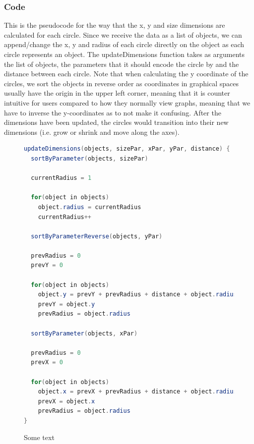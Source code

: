 \documentclass[Report.tex]{subfiles}
\begin{document}
\subsubsection{Code}
This is the pseudocode for the way that the x, y and size dimensions are calculated for each circle.
Since we receive the data as a list of objects, we can append/change the x, y and radius of each circle directly on the object as each circle represents an object. The updateDimensions function takes as arguments the list of objects, the parameters that it should encode the circle by and the distance between each circle. Note that when calculating the y coordinate of the circles, we sort the objects in reverse order as coordinates in graphical spaces usually have the origin in the upper left corner, meaning that it is counter intuitive for users compared to how they normally view graphs, meaning that we have to inverse the y-coordinates as to not make it confusing. After the dimensions have been updated, the circles would transition into their new dimensions (i.e. grow or shrink and move along the axes).
\begin{figure}
\begin{lstlisting}[language=java]
updateDimensions(objects, sizePar, xPar, yPar, distance) {
  sortByParameter(objects, sizePar)

  currentRadius = 1

  for(object in objects)
    object.radius = currentRadius
    currentRadius++

  sortByParameterReverse(objects, yPar)

  prevRadius = 0
  prevY = 0

  for(object in objects)
    object.y = prevY + prevRadius + distance + object.radius
    prevY = object.y
    prevRadius = object.radius

  sortByParameter(objects, xPar)

  prevRadius = 0
  prevX = 0

  for(object in objects)
    object.x = prevX + prevRadius + distance + object.radius
    prevX = object.x
    prevRadius = object.radius
}
\end{lstlisting}
\caption{Some text}
\end{figure}
\end{document}

